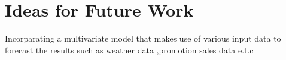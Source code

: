 \documentclass[12pt]{report}
\begin{document}
\section{Ideas for Future Work}
Incorparating a multivariate model that makes use of various input data to forecast the results such as weather data ,promotion sales data e.t.c














%

\medskip
%
%
%
\end{document}
